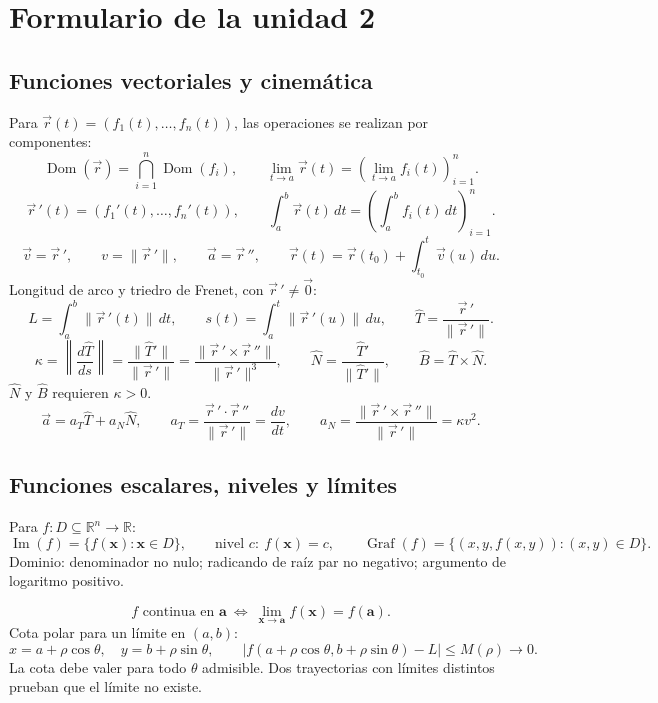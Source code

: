 \section{Formulario de la unidad 2}
\begingroup
\footnotesize
\setlength{\parindent}{0pt}
\setlength{\abovedisplayskip}{3pt}
\setlength{\belowdisplayskip}{3pt}
\setlength{\abovedisplayshortskip}{3pt}
\setlength{\belowdisplayshortskip}{3pt}

\subsection*{Funciones vectoriales y cinemática}
Para $\vec r(t)=(f_1(t),\ldots,f_n(t))$, las operaciones se realizan por componentes:
\[
\operatorname{Dom}(\vec r)=\bigcap_{i=1}^n\operatorname{Dom}(f_i),\qquad
\lim_{t\to a}\vec r(t)=\left(\lim_{t\to a}f_i(t)\right)_{i=1}^n.
\]
\[
\vec r\,'(t)=(f_1'(t),\ldots,f_n'(t)),\qquad
\int_a^b\vec r(t)\,dt=\left(\int_a^b f_i(t)\,dt\right)_{i=1}^n.
\]
\[
\vec v=\vec r\,',\qquad v=\|\vec r\,'\|,\qquad
\vec a=\vec r\,'',\qquad
\vec r(t)=\vec r(t_0)+\int_{t_0}^t\vec v(u)\,du.
\]
Longitud de arco y triedro de Frenet, con $\vec r\,'\ne\vec0$:
\[
L=\int_a^b\|\vec r\,'(t)\|\,dt,\qquad
s(t)=\int_a^t\|\vec r\,'(u)\|\,du,\qquad
\hat T=\frac{\vec r\,'}{\|\vec r\,'\|}.
\]
\[
\kappa=\left\|\frac{d\hat T}{ds}\right\|
=\frac{\|\hat T'\|}{\|\vec r\,'\|}
=\frac{\|\vec r\,'\times\vec r\,''\|}{\|\vec r\,'\|^3},\qquad
\hat N=\frac{\hat T'}{\|\hat T'\|},\qquad \hat B=\hat T\times\hat N.
\]
$\hat N$ y $\hat B$ requieren $\kappa>0$.
\[
\vec a=a_T\hat T+a_N\hat N,\qquad
a_T=\frac{\vec r\,'\cdot\vec r\,''}{\|\vec r\,'\|}=\frac{dv}{dt},\qquad
a_N=\frac{\|\vec r\,'\times\vec r\,''\|}{\|\vec r\,'\|}=\kappa v^2.
\]

\subsection*{Funciones escalares, niveles y límites}
Para $f:D\subseteq\mathbb R^n\to\mathbb R$:
\[
\operatorname{Im}(f)=\{f(\mathbf x):\mathbf x\in D\},\qquad
\text{nivel }c:\ f(\mathbf x)=c,\qquad
\operatorname{Graf}(f)=\{(x,y,f(x,y)):(x,y)\in D\}.
\]
Dominio: denominador no nulo; radicando de raíz par no negativo;
argumento de logaritmo positivo.

\[
f\text{ continua en }\mathbf a\ \Longleftrightarrow\
\lim_{\mathbf x\to\mathbf a}f(\mathbf x)=f(\mathbf a).
\]
Cota polar para un límite en $(a,b)$:
\[
x=a+\rho\cos\theta,\quad y=b+\rho\sin\theta,\qquad
|f(a+\rho\cos\theta,b+\rho\sin\theta)-L|\leq M(\rho)\longrightarrow0.
\]
La cota debe valer para todo $\theta$ admisible. Dos trayectorias con límites
 distintos prueban que el límite no existe.


